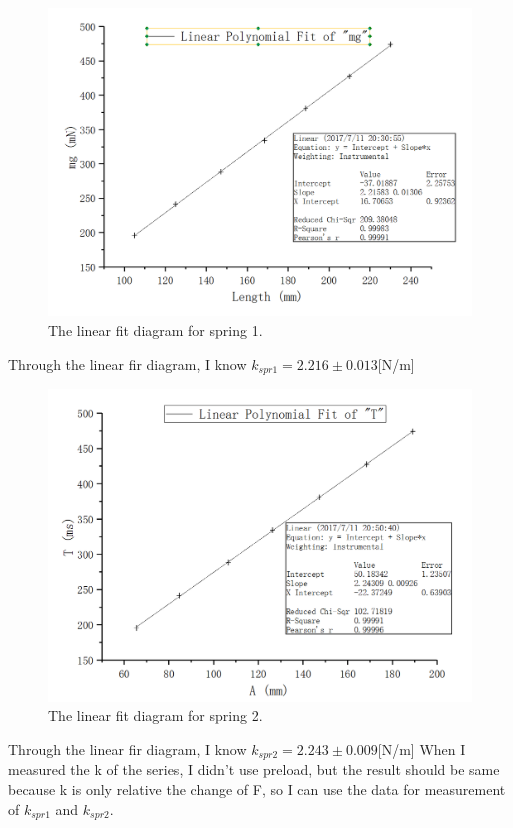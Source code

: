 \documentclass[12pt]{article}
\begin{document}
\begin{figure}[H]
\centering
\includegraphics[scale=0.4]{P5.jpg}
\caption{The linear fit diagram for spring 1.}
\end{figure}
Through the linear fir diagram, I know $k_{spr1}=2.216\pm0.013$[N/m] 
\begin{figure}[H]
\centering
\includegraphics[scale=0.4]{P6.jpg}
\caption{The linear fit diagram for spring 2.}
\end{figure}
Through the linear fir diagram, I know $k_{spr2}=2.243\pm0.009$[N/m] 
When I measured the k of the series, I didn't use preload, but the result should be same because k is only relative the change of F, so I can use the data for measurement of $k_{spr1}$ and $k_{spr2}$.
\end{document}
